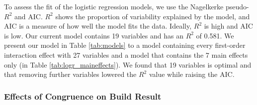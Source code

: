 
To assess the fit of the logistic regression models, we use the Nagelkerke pseudo-$R^2$ and AIC. $R^2$ shows the proportion of variability explained by the model, and AIC is a measure of how well the model fits the data. Ideally, $R^2$ is high and AIC is low. Our current model contains 19 variables and has an $R^2$ of 0.581. We present our model in Table \ref{tab:models} to a model containing every first-order interaction effect with 27 variables and a model that contains the 7 main effects only (in Table \ref{tab:logr_maineffects}). We found that 19 variables is optimal and that removing further variables lowered the $R^2$ value while raising the AIC.


\subsubsection{Effects of Congruence on Build Result}
\label{sec:congruence_effect_build_result}




